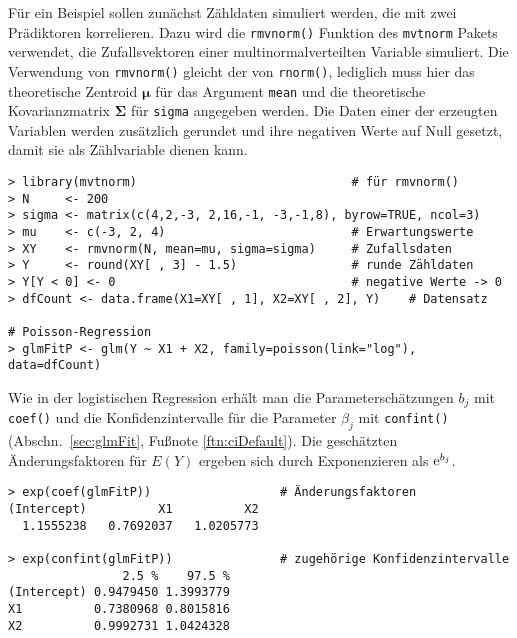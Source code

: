 Für ein Beispiel sollen zunächst Zähldaten simuliert werden, die mit zwei Prädiktoren korrelieren. Dazu wird die \lstinline!rmvnorm()! Funktion des \lstinline!mvtnorm! Pakets verwendet, die Zufallsvektoren einer multinormalverteilten Variable simuliert. Die Verwendung von \lstinline!rmvnorm()! gleicht der von \lstinline!rnorm()!, lediglich muss hier das theoretische Zentroid $\bm{\mu}$ für das Argument \lstinline!mean! und die theoretische Kovarianzmatrix $\bm{\Sigma}$ für \lstinline!sigma! angegeben werden. Die Daten einer der erzeugten Variablen werden zusätzlich gerundet und ihre negativen Werte auf Null gesetzt, damit sie als Zählvariable dienen kann.
\begin{lstlisting}
> library(mvtnorm)                              # für rmvnorm()
> N     <- 200
> sigma <- matrix(c(4,2,-3, 2,16,-1, -3,-1,8), byrow=TRUE, ncol=3)
> mu    <- c(-3, 2, 4)                          # Erwartungswerte
> XY    <- rmvnorm(N, mean=mu, sigma=sigma)     # Zufallsdaten
> Y     <- round(XY[ , 3] - 1.5)                # runde Zähldaten
> Y[Y < 0] <- 0                                 # negative Werte -> 0
> dfCount <- data.frame(X1=XY[ , 1], X2=XY[ , 2], Y)    # Datensatz

# Poisson-Regression
> glmFitP <- glm(Y ~ X1 + X2, family=poisson(link="log"), data=dfCount)
\end{lstlisting}

Wie in der logistischen Regression erhält man die Parameterschätzungen $b_{j}$ mit \lstinline!coef()! und die Konfidenzintervalle für die Parameter $\beta_{j}$ mit \lstinline!confint()! (Abschn.\ \ref{sec:glmFit}, Fußnote \ref{ftn:ciDefault}). Die geschätzten Änderungsfaktoren für $E(Y)$ ergeben sich durch Exponenzieren als ${\mathrm{e}}^{b_{j}}$.
\begin{lstlisting}
> exp(coef(glmFitP))                  # Änderungsfaktoren
(Intercept)          X1          X2
  1.1555238   0.7692037   1.0205773

> exp(confint(glmFitP))               # zugehörige Konfidenzintervalle
                2.5 %    97.5 %
(Intercept) 0.9479450 1.3993779
X1          0.7380968 0.8015816
X2          0.9992731 1.0424328
\end{lstlisting}

